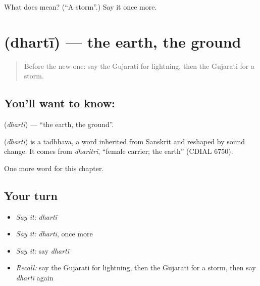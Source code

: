\begin{tcolorbox}[breakable,colback=teal!4,colframe=teal!35!black,title={Before you move on}]
What does  mean? (\textquotedblleft{}A storm\textquotedblright{}.) Say it once more.
\end{tcolorbox}
\section[\texorpdfstring{\gu{ધરતી} (dhartī)}{ધરતી (dhartī)}]{ (dhartī) — the earth, the ground}

\label{lesson:GU-C120-dharti}



\begin{quote}
Before the new one: say the Gujarati for lightning, then the Gujarati for a storm.
\end{quote}

\subsection*{You'll want to know: }
\textbf{} (\emph{dhartī}) — \textquotedblleft{}the earth, the ground\textquotedblright{}.

\begin{cousinweb}
\textbf{} (\emph{dhartī}) is a tadbhava, a word inherited from Sanskrit and reshaped by sound change. It comes from \emph{dharitrī}, \textquotedblleft{}female carrier; the earth\textquotedblright{} (CDIAL 6750).
\end{cousinweb}

\begin{grammarlens}[title={What you've built}]
One more word for this chapter.
\end{grammarlens}

\subsection*{Your turn}
\begin{itemize}
\raggedright
  \item \emph{Say it:} \emph{dhartī}
  \item \emph{Say it:} \emph{dhartī}, once more
  \item \emph{Say it:} say \emph{dhartī}
  \item \emph{Recall:} say the Gujarati for lightning, then the Gujarati for a storm, then say \emph{dhartī} again
\end{itemize}

